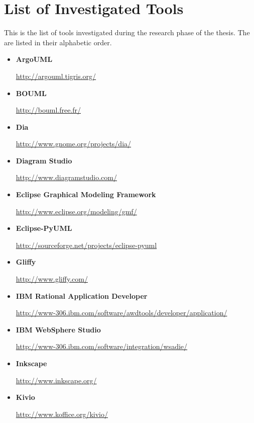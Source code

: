 \chapter{List of Investigated Tools}
\beginchapter
This is the list of tools investigated during the research phase of the thesis. The are listed in their alphabetic order.

\begin{itemize}
\item {\bf ArgoUML}
\par \noindent \url{http://argouml.tigris.org/}

\item {\bf BOUML}
\par \noindent \url{http://bouml.free.fr/}

\item {\bf Dia}
\par \noindent \url{http://www.gnome.org/projects/dia/}

\item {\bf Diagram Studio}
\par \noindent \url{http://www.diagramstudio.com/}

\item {\bf Eclipse Graphical Modeling Framework}
\par \noindent \url{http://www.eclipse.org/modeling/gmf/}

\item {\bf Eclipse-PyUML}
\par \noindent \url{http://sourceforge.net/projects/eclipse-pyuml}

\item {\bf Gliffy}
\par \noindent \url{http://www.gliffy.com/}

\item {\bf IBM Rational Application Developer}
\par \noindent \url{http://www-306.ibm.com/software/awdtools/developer/application/}

\item {\bf IBM WebSphere Studio}
\par \noindent \url{http://www-306.ibm.com/software/integration/wsadie/}

\item {\bf Inkscape}
\par \noindent \url{http://www.inkscape.org/}

\item {\bf Kivio}
\par \noindent \url{http://www.koffice.org/kivio/}


\end{itemize}
